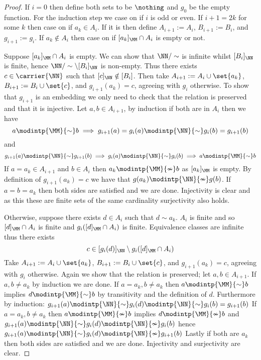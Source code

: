 \begin{proof}
    If $i = 0$ then define both sets to be 
    $\nothing$ and $g_0$ be the empty function.
    For the induction step we case on if $i$ is odd or even.
    If $i + 1 = 2k$ for some $k$ then case on if $a_k \in A_i$.
    If it is then define $A_{i+1} := A_i$, 
    $B_{i+1} := B_i$, 
    and $g_{i+1} := g_i$.
    If $a_k \notin A_i$ then case on if $[a_k]_\MM \cap A_i$ is empty or not.

    Suppose $[a_k]_\MM \cap A_i$ is empty.
    We can show that $\NN / \sim$ is infinite whilst 
    $[B_i]_{\NN}$ is finite, 
    hence $\NN / \sim \setminus [B_i]_{\NN}$ is non-empty.
    Thus there exists 
    $c \in \carrier{\NN}$ such that $[c]_\NN \notin [B_i]$.
    Then take $A_{i+1} := A_i \cup \set{a_k}$, 
    $B_{i+1} := B_i \cup \set{c}$, 
    and $g_{i+1}(a_k) = c$, 
    agreeing with $g_i$ otherwise.
    To show that $g_{i+1}$ is an embedding we only need to check that 
    the relation is preserved and that it is injective.
    Let $a,b \in A_{i+1}$, by induction if 
    both are in $A_i$ then we have
    \[a \modintp{\MM}{\sim} b \implies 
    g_{i+1} (a) = g_i (a) \modintp{\NN}{\sim} g_i (b) = g_{i+1} (b)\]
    and 
    \[g_{i+1} (a) \modintp{\NN}{\sim} g_{i+1} (b)
    \implies g_i (a) \modintp{\NN}{\sim} g_i (b)
    \implies a \modintp{\MM}{\sim} b\]
    If $a = a_k \in A_{i+1}$ and $b \in A_i$ then $a_k \modintp{\MM}{\nsim} b$
    as $[a_k]_\MM$ is empty.
    By definition of $g_{i+1}(a_k) = c$ we have that 
    $g(a_k) \modintp{\NN}{\nsim} g(b)$.
    If $a = b = a_k$ then both sides are satisfied and we are done.
    Injectivity is clear and as this these are finite sets
    of the same cardinality surjectivity also holds.

    Otherwise, suppose there exists $d \in A_i$ such that $d \sim a_k$.
    $A_i$ is finite and so
    $[d]_\MM \cap A_i$ is finite and $g_i([d]_\MM \cap A_i)$ is finite.
    Equivalence classes are infinite thus there exists 
    \[c \in [g_i(d)]_\NN \setminus g_i([d]_\MM \cap A_i)\]
    Take $A_{i+1} := A_i \cup \set{a_k}$, 
    $B_{i+1} := B_i \cup \set{c}$, 
    and $g_{i+1}(a_k) = c$, 
    agreeing with $g_i$ otherwise.
    Again we show that the relation is preserved;
    let $a,b \in A_{i+1}$. 
    If $a,b \ne a_k$ by induction we 
    are done.
    If $a = a_k, b \ne a_k$ then $a \modintp{\MM}{\sim} b$ implies 
    $d \modintp{\MM}{\sim} b$ by transitivity and the definition of $d$.
    Furthermore by induction:
    $g_{i+1}(a) \modintp{\NN}{\sim} g_{i}(d) 
    \modintp{\NN}{\sim} g_{i}(b) = g_{i+1}(b)$
    If $a = a_k, b \ne a_k$ then $a \modintp{\MM}{\nsim} b$ implies 
    $d \modintp{\MM}{\nsim} b$ and 
    $g_{i+1}(a) \modintp{\NN}{\sim} g_{i}(d) \modintp{\NN}{\nsim} g_{i}(b)$
    hence 
    $g_{i+1}(a) \modintp{\NN}{\sim} g_{i}(d) \modintp{\NN}{\nsim} g_{i+1}(b)$
    Lastly if both are $a_k$ then both sides are satisfied and we are done.
    Injectivity and surjectivity are clear.


\end{proof}
